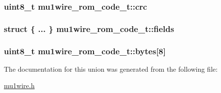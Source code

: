 \hypertarget{unionmu1wire__rom__code__t_0280c907515345f652f53106d00d789a}{
\subsubsection{\setlength{\rightskip}{0pt plus 5cm}uint8\_\-t {\bf mu1wire\_\-rom\_\-code\_\-t::crc}}}
\label{unionmu1wire__rom__code__t_0280c907515345f652f53106d00d789a}


\hypertarget{unionmu1wire__rom__code__t_81b2c0cdfe4f51213f81a7158a389027}{
\subsubsection{\setlength{\rightskip}{0pt plus 5cm}struct \{ ... \}   {\bf mu1wire\_\-rom\_\-code\_\-t::fields}}}
\label{unionmu1wire__rom__code__t_81b2c0cdfe4f51213f81a7158a389027}


\hypertarget{unionmu1wire__rom__code__t_39305b4006b16b1a6acef9b3193820f3}{
\subsubsection{\setlength{\rightskip}{0pt plus 5cm}uint8\_\-t {\bf mu1wire\_\-rom\_\-code\_\-t::bytes}\mbox{[}8\mbox{]}}}
\label{unionmu1wire__rom__code__t_39305b4006b16b1a6acef9b3193820f3}




The documentation for this union was generated from the following file:\begin{CompactItemize}
\item 
\hyperlink{mu1wire_8h}{mu1wire.h}\end{CompactItemize}

